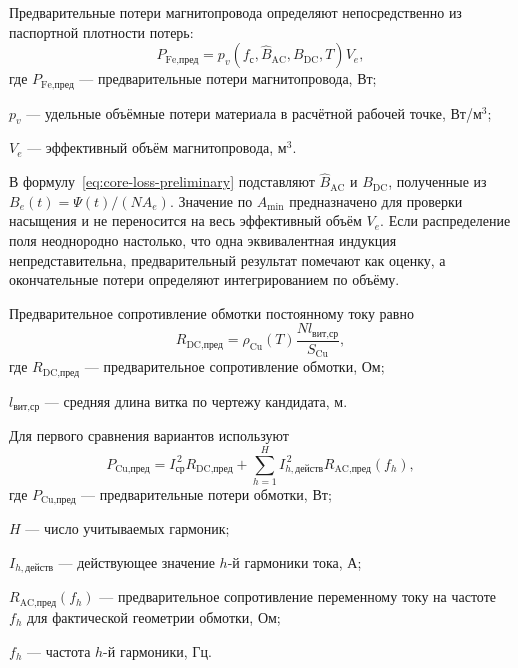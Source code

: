 \documentclass[14pt,a4paper]{extarticle}
\begin{document}
Предварительные потери магнитопровода определяют непосредственно из
паспортной плотности потерь:
\begin{equation}
 P_{\text{Fe,пред}}=
 p_v\!\left(f_{\text{с}},\widehat B_{\text{AC}},
 B_{\text{DC}},T\right)V_e,
 \label{eq:core-loss-preliminary}
\end{equation}
где $P_{\text{Fe,пред}}$ --- предварительные потери магнитопровода, Вт;\par\noindent
$p_v$ --- удельные объёмные потери материала в расчётной рабочей точке,
Вт/м$^3$;\par\noindent
$V_e$ --- эффективный объём магнитопровода, м$^3$.

В формулу~\eqref{eq:core-loss-preliminary} подставляют
$\widehat B_{\text{AC}}$ и $B_{\text{DC}}$, полученные из
$B_e(t)=\Psi(t)/(N A_e)$. Значение по $A_{\min}$ предназначено для
проверки насыщения и не переносится на весь эффективный объём $V_e$.
Если распределение поля неоднородно настолько, что одна эквивалентная
индукция непредставительна, предварительный результат помечают как оценку,
а окончательные потери определяют интегрированием по объёму.

Предварительное сопротивление обмотки постоянному току равно
\begin{equation}
 R_{\text{DC,пред}}=
 \rho_{\text{Cu}}(T)
 \frac{N l_{\text{вит,ср}}}{S_{\text{Cu}}},
 \label{eq:rdc-preliminary}
\end{equation}
где $R_{\text{DC,пред}}$ --- предварительное сопротивление обмотки, Ом;\par\noindent
$l_{\text{вит,ср}}$ --- средняя длина витка по чертежу кандидата, м.

Для первого сравнения вариантов используют
\begin{equation}
 P_{\text{Cu,пред}}=
 I_{\text{ср}}^{\,2}R_{\text{DC,пред}}
 +\sum_{h=1}^{H}
 I_{h,\text{действ}}^{\,2}
 R_{\text{AC,пред}}(f_h),
 \label{eq:copper-loss-preliminary}
\end{equation}
где $P_{\text{Cu,пред}}$ --- предварительные потери обмотки, Вт;\par\noindent
$H$ --- число учитываемых гармоник;\par\noindent
$I_{h,\text{действ}}$ --- действующее значение $h$-й гармоники тока,
А;\par\noindent
$R_{\text{AC,пред}}(f_h)$ --- предварительное сопротивление переменному
току на частоте $f_h$ для фактической геометрии обмотки, Ом;\par\noindent
$f_h$ --- частота $h$-й гармоники, Гц.
\end{document}
